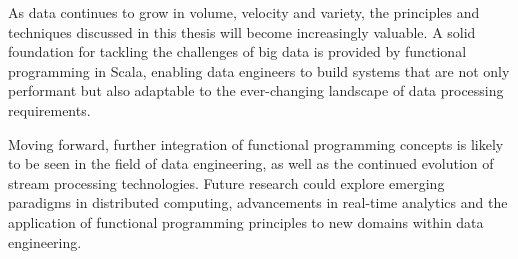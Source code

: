 As data continues to grow in volume, velocity and variety, the principles and techniques discussed in this thesis will become increasingly valuable. A solid foundation for tackling the challenges of big data is provided by functional programming in Scala, enabling data engineers to build systems that are not only performant but also adaptable to the ever-changing landscape of data processing requirements.

Moving forward, further integration of functional programming concepts is likely to be seen in the field of data engineering, as well as the continued evolution of stream processing technologies. Future research could explore emerging paradigms in distributed computing, advancements in real-time analytics and the application of functional programming principles to new domains within data engineering.
